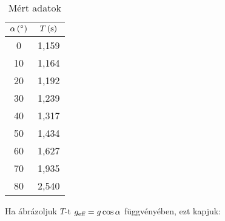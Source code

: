 \documentclass[12pt]{article}
\begin{document}
  
  \begin{table}[H]
    \begin{center}
      \begin{tabular}{|
c|
c|
}
        \hline
        
\ensuremath{\unit[\text{\ensuremath{\alpha}}]{({}^\circ)}} & 
\ensuremath{\unit[\text{\ensuremath{T}}]{(s)}}
\\
        \hline\hline
        
0
 & 1,159
\\
        \hline
        
10
 & 1,164
\\
        \hline
        
20
 & 1,192
\\
        \hline
        
30
 & 1,239
\\
        \hline
        
40
 & 1,317
\\
        \hline
        
50
 & 1,434
\\
        \hline
        
60
 & 1,627
\\
        \hline
        
70
 & 1,935
\\
        \hline
        
80
 & 2,540
\\
        \hline
      \end{tabular}
      \caption{Mért adatok}
      \label{tab:}
    \end{center}
  \end{table}

Ha ábrázoljuk $T$-t $g_\text{eff} = g \cos \alpha$ függvényében, ezt kapjuk:
\end{document}
